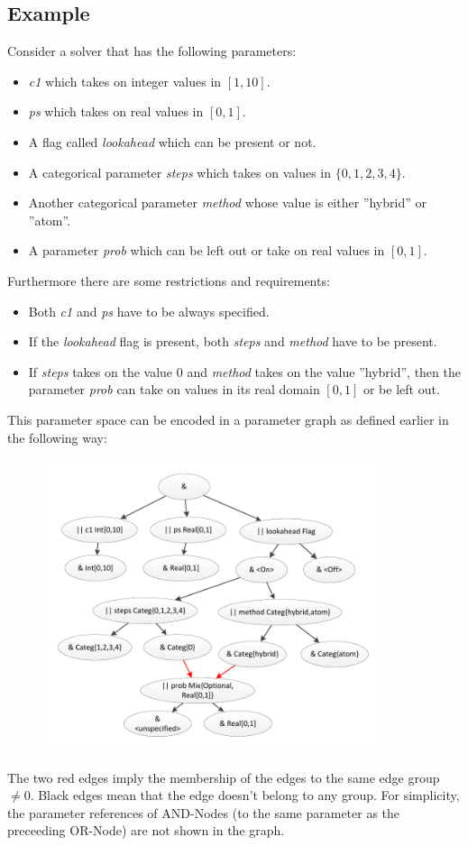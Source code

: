 \subsection{Example}
\label{paramspecexample}
\marginlabel{\Eexample}
Consider a solver that has the following parameters:
\begin{itemize}
\item \textit{c1} which takes on integer values in $[1,10]$.
\item \textit{ps} which takes on real values in $[0,1]$.
\item A flag called \textit{lookahead} which can be present or not.
\item A categorical parameter \textit{steps} which takes on values in $\{0,1,2,3,4\}$.
\item Another categorical parameter \textit{method} whose value is either ''hybrid'' or ''atom''.
\item A parameter \textit{prob} which can be left out or take on real values in $[0,1]$.
\end{itemize}
Furthermore there are some restrictions and requirements:
\begin{itemize}
\item Both \textit{c1} and \textit{ps} have to be always specified.
\item If the \textit{lookahead} flag is present, both \textit{steps} and \textit{method} have to be present.
\item If \textit{steps} takes on the value $0$ and \textit{method} takes on the value ''hybrid'', then the parameter \textit{prob} can take on values in its real domain $[0,1]$ or be left out.
\end{itemize}
This parameter space can be encoded in a parameter graph as defined earlier in the following way:
\begin{figure}[htb]
\includegraphics[width=10cm]{paramgraph.pdf}
\end{figure}

The two red edges imply the membership of the edges to the same edge group $\neq 0$. Black edges mean that the edge doesn't belong to any group.
For simplicity, the parameter references of AND-Nodes (to the same parameter as the preceeding OR-Node) are not shown in the graph.

